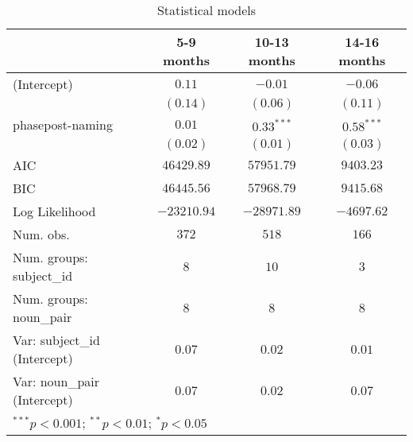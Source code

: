 
\begin{table}
\begin{center}
\begin{tabular}{l c c c}
\hline
 & 5-9 months & 10-13 months & 14-16 months \\
\hline
(Intercept)                  & $0.11$      & $-0.01$      & $-0.06$      \\
                             & $(0.14)$    & $(0.06)$     & $(0.11)$     \\
phasepost-naming             & $0.01$      & $0.33^{***}$ & $0.58^{***}$ \\
                             & $(0.02)$    & $(0.01)$     & $(0.03)$     \\
\hline
AIC                          & $46429.89$  & $57951.79$   & $9403.23$    \\
BIC                          & $46445.56$  & $57968.79$   & $9415.68$    \\
Log Likelihood               & $-23210.94$ & $-28971.89$  & $-4697.62$   \\
Num. obs.                    & $372$       & $518$        & $166$        \\
Num. groups: subject\_id     & $8$         & $10$         & $3$          \\
Num. groups: noun\_pair      & $8$         & $8$          & $8$          \\
Var: subject\_id (Intercept) & $0.07$      & $0.02$       & $0.01$       \\
Var: noun\_pair (Intercept)  & $0.07$      & $0.02$       & $0.07$       \\
\hline
\multicolumn{4}{l}{\scriptsize{$^{***}p<0.001$; $^{**}p<0.01$; $^{*}p<0.05$}}
\end{tabular}
\caption{Statistical models}
\label{table:coefficients}
\end{center}
\end{table}

